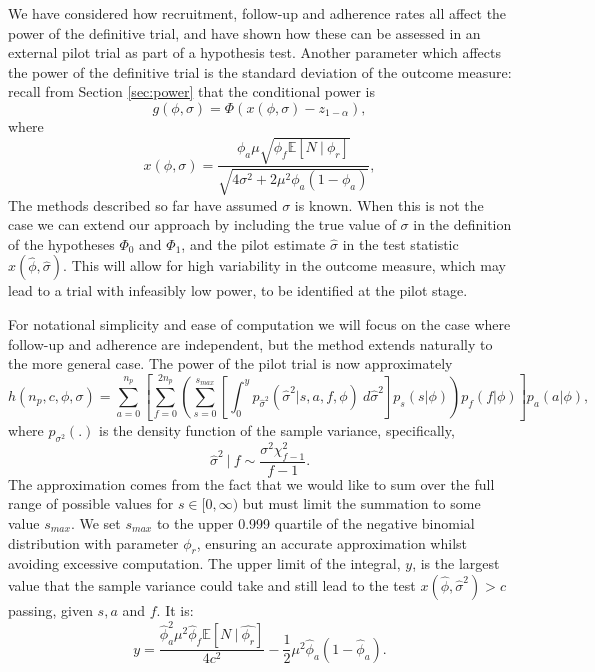 \documentclass{article}
\begin{document}
We have considered how recruitment, follow-up and adherence rates all affect the power of the definitive trial, and have shown how these can be assessed in an external pilot trial as part of a hypothesis test. Another parameter which affects the power of the definitive trial is the standard deviation of the outcome measure: recall from Section \ref{sec:power} that the conditional power is 
$$
g(\phi, \sigma) = \Phi \left( x(\phi, \sigma) - z_{1-\alpha} \right),
$$
where
$$
x(\phi, \sigma) =  \frac{ \phi_a\mu \sqrt{\phi_f \mathbb{E}[N ~|~ \phi_r]} } {\sqrt{4\sigma^2 + 2 \mu^2 \phi_a(1-\phi_a)}},
$$
The methods described so far have assumed $\sigma$ is known. When this is not the case we can extend our approach by including the true value of $\sigma$ in the definition of the hypotheses $\Phi_0$ and $\Phi_1$, and the pilot estimate $\hat{\sigma}$ in the test statistic $x(\hat{\phi}, \hat{\sigma})$. This will allow for high variability in the outcome measure, which may lead to a trial with infeasibly low power, to be identified at the pilot stage.

For notational simplicity and ease of computation we will focus on the case where follow-up and adherence are independent, but the method extends naturally to the more general case. The power of the pilot trial is now approximately 
\begin{equation*}
h(n_p, c, \phi, \sigma) = \sum_{a=0}^{n_p} \left[  \sum_{f=0}^{2n_p} \left( \sum_{s = 0}^{s_{max}} 
\left[ \int_0^y p_{\hat{\sigma}^2}( \hat{\sigma}^2 | s, a, f, \phi) ~ d\hat{\sigma}^2 \right] 
p_s(s | \phi) \right) p_{f}(f |\phi)  \right] p_a(a | \phi),
\end{equation*}
where $p_{\sigma^2}(.)$ is the density function of the sample variance, specifically,
$$
\hat{\sigma}^2 ~|~  f \sim \frac{\sigma^2 \chi^2_{f - 1}}{f - 1}.
$$
The approximation comes from the fact that we would like to sum over the full range of possible values for $s \in [0, \infty)$ but must limit the summation to some value $s_{max}$. We set $s_{max}$ to the upper 0.999 quartile of the negative binomial distribution with parameter $\phi_r$, ensuring an accurate approximation whilst avoiding excessive computation. The upper limit of the integral, $y$, is the largest value that the sample variance could take and still lead to the test $x(\hat{\phi}, \hat{\sigma}^2) > c$ passing, given $s, a$ and $f$. It is:
$$
y = \frac{\hat{\phi}_a^2 \mu^2 \hat{\phi}_f \mathbb{E}[N ~|~ \hat{\phi_r}]}{4c^2} - \frac{1}{2} \mu^2 \hat{\phi}_a (1-\hat{\phi}_a).
$$
 
\end{document}

